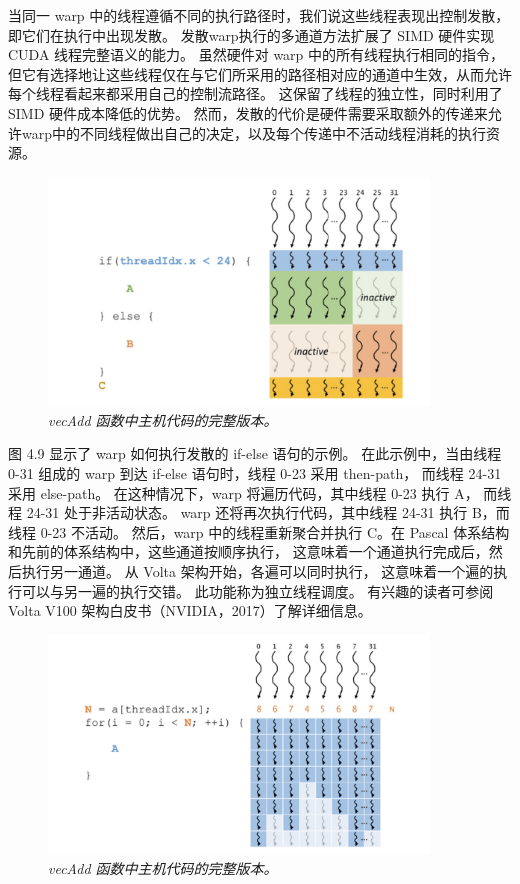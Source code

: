 当同一 warp 中的线程遵循不同的执行路径时，我们说这些线程表现出控制发散，即它们在执行中出现发散。 
发散warp执行的多通道方法扩展了 SIMD 硬件实现 CUDA 线程完整语义的能力。 虽然硬件对 warp 中的所有线程执行相同的指令，
但它有选择地让这些线程仅在与它们所采用的路径相对应的通道中生效，从而允许每个线程看起来都采用自己的控制流路径。 
这保留了线程的独立性，同时利用了 SIMD 硬件成本降低的优势。 
然而，发散的代价是硬件需要采取额外的传递来允许warp中的不同线程做出自己的决定，以及每个传递中不活动线程消耗的执行资源。

\begin{figure}[H]
	\centering
	\includegraphics[width=0.9\textwidth]{figs/F4.9.png}
	\caption{\textit{\color{red} vecAdd 函数中主机代码的完整版本。}}
\end{figure}

图 4.9 显示了 warp 如何执行发散的 if-else 语句的示例。 
在此示例中，当由线程 0-31 组成的 warp 到达 if-else 语句时，线程 0-23 采用 then-path，
而线程 24-31 采用 else-path。 在这种情况下，warp 将遍历代码，其中线程 0-23 执行 A，
而线程 24-31 处于非活动状态。 warp 还将再次执行代码，其中线程 24-31 执行 B，而线程 0-23 不活动。 
然后，warp 中的线程重新聚合并执行 C。在 Pascal 体系结构和先前的体系结构中，这些通道按顺序执行，
这意味着一个通道执行完成后，然后执行另一通道。 从 Volta 架构开始，各遍可以同时执行，
这意味着一个遍的执行可以与另一遍的执行交错。 此功能称为独立线程调度。 
有兴趣的读者可参阅 Volta V100 架构白皮书（NVIDIA，2017）了解详细信息。

\begin{figure}[H]
	\centering
	\includegraphics[width=0.9\textwidth]{figs/F4.10.png}
	\caption{\textit{\color{red} vecAdd 函数中主机代码的完整版本。}}
\end{figure}

